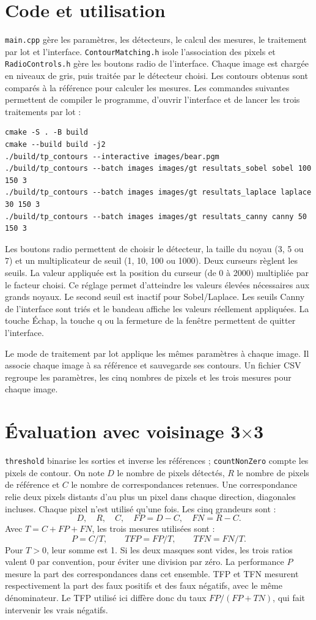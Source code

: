 \documentclass[a4paper,11pt]{article}
\begin{document}
\section{Code et utilisation}
\texttt{main.cpp} gère les paramètres, les détecteurs, le calcul des mesures,
le traitement par lot et l'interface.
\texttt{ContourMatching.h} isole l'association des pixels et
\texttt{RadioControls.h} gère les boutons radio de l'interface.
Chaque image est chargée en niveaux de gris, puis traitée par le détecteur choisi.
Les contours obtenus sont comparés à la référence pour calculer les mesures.
Les commandes suivantes permettent de compiler le programme, d'ouvrir
l'interface et de lancer les trois traitements par lot :
\begin{lstlisting}
cmake -S . -B build
cmake --build build -j2
./build/tp_contours --interactive images/bear.pgm
./build/tp_contours --batch images images/gt resultats_sobel sobel 100 150 3
./build/tp_contours --batch images images/gt resultats_laplace laplace 30 150 3
./build/tp_contours --batch images images/gt resultats_canny canny 50 150 3
\end{lstlisting}
Les boutons radio permettent de choisir le détecteur, la taille du noyau
(3, 5 ou 7) et un multiplicateur de seuil (1, 10, 100 ou 1000).
Deux curseurs règlent les seuils. La valeur appliquée est la position du curseur
(de 0 à 2000) multipliée par le facteur choisi. Ce réglage permet d'atteindre
les valeurs élevées nécessaires aux grands noyaux.
Le second seuil est inactif pour Sobel/Laplace. Les seuils Canny de l'interface
sont triés et le bandeau affiche les valeurs réellement appliquées.
La touche Échap, la touche q ou la fermeture de la fenêtre permettent de quitter
l'interface.

Le mode de traitement par lot applique les mêmes paramètres à chaque image.
Il associe chaque image à sa référence et sauvegarde ses contours.
Un fichier CSV regroupe les paramètres, les cinq nombres de pixels et les trois
mesures pour chaque image.

\section{Évaluation avec voisinage 3\texorpdfstring{$\times$}{x}3}
\texttt{threshold} binarise les sorties et inverse les références ;
\texttt{countNonZero} compte les pixels de contour. On note $D$ le nombre de
pixels détectés, $R$ le nombre de pixels de référence et $C$ le nombre de
correspondances retenues. Une correspondance relie deux pixels distants
d'au plus un pixel dans chaque direction, diagonales incluses. Chaque pixel
n'est utilisé qu'une fois. Les cinq grandeurs sont :
\[D,\quad R,\quad C,\quad FP=D-C,\quad FN=R-C.\]
Avec $T=C+FP+FN$, les trois mesures utilisées sont :
\[P=C/T,\qquad TFP=FP/T,\qquad TFN=FN/T.\]
Pour $T>0$, leur somme est 1. Si les deux masques sont vides, les trois ratios
valent 0 par convention, pour éviter une division par zéro.
La performance $P$ mesure la part des correspondances dans cet ensemble.
TFP et TFN mesurent respectivement la part des faux positifs et des faux négatifs,
avec le même dénominateur. Le TFP utilisé ici diffère donc du taux
$FP/(FP+TN)$, qui fait intervenir les vrais négatifs.
\end{document}
